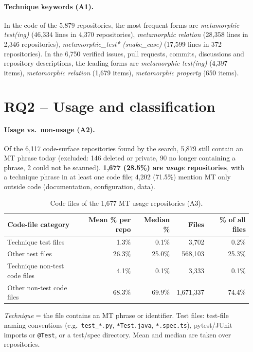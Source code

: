 \documentclass[11pt,a4paper]{article}
\begin{document}
\paragraph{Technique keywords (A1).} In the code of the 5,879 repositories, the most frequent forms are \emph{metamorphic test(ing)} (46,334 lines in 4,370 repositories), \emph{metamorphic relation} (28,358 lines in 2,346 repositories), \emph{metamorphic\_test* (snake\_case)} (17,599 lines in 372 repositories). In the 6,750 verified issues, pull requests, commits, discussions and repository descriptions, the leading forms are \emph{metamorphic test(ing)} (4,397 items), \emph{metamorphic relation} (1,679 items), \emph{metamorphic property} (650 items).

\section{RQ2 -- Usage and classification}

\paragraph{Usage vs.\ non-usage (A2).} Of the 6,117 code-surface repositories found by the search, 5,879 still contain an MT phrase today (excluded: 146 deleted or private, 90 no longer containing a phrase, 2 could not be scanned). \textbf{1,677 (28.5\%) are \emph{usage} repositories}, with a technique phrase in at least one code file; 4,202 (71.5\%) mention MT only outside code (documentation, configuration, data).

\begin{table}[htbp]
\centering
\small
\caption{Code files of the 1,677 MT usage repositories (A3).}
\label{tab:mt-a3}
\begin{tabular}{@{}lrrrr@{}}
\toprule
Code-file category & Mean \% per repo & Median \% & Files & \% of all files \\
\midrule
Technique test files & 1.3\% & 0.1\% & 3,702 & 0.2\% \\
Other test files & 26.3\% & 25.0\% & 568,103 & 25.3\% \\
Technique non-test code files & 4.1\% & 0.1\% & 3,333 & 0.1\% \\
Other non-test code files & 68.3\% & 69.9\% & 1,671,337 & 74.4\% \\
\bottomrule
\end{tabular}
\par\smallskip\parbox{0.94\linewidth}{\footnotesize \emph{Technique} = the file contains an MT phrase or identifier. Test files: test-file naming conventions (e.g.\ \texttt{test\_*.py}, \texttt{*Test.java}, \texttt{*.spec.ts}), pytest/JUnit imports or \texttt{@Test}, or a test/spec directory. Mean and median are taken over repositories.}
\end{table}
\end{document}

